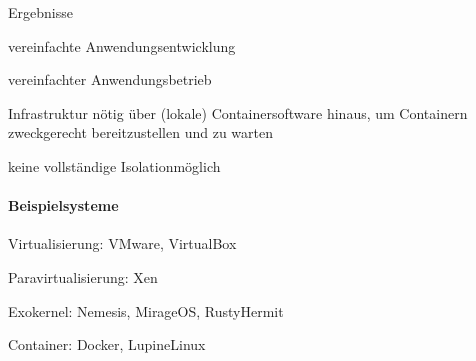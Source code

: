 \documentclass[a4paper]{article}
\newcommand{\cmark}{\ding{51}}
\newcommand{\xmark}{\ding{55}}
\begin{document}
\begin{multicols}{3}
    Ergebnisse
    \begin{itemize*}
        \item[\cmark] vereinfachte Anwendungsentwicklung
        \item[\cmark] vereinfachter Anwendungsbetrieb
        \item[\xmark] Infrastruktur nötig über (lokale) Containersoftware hinaus, um Containern zweckgerecht bereitzustellen und zu warten
        \item[\xmark] keine vollständige Isolationmöglich
    \end{itemize*}

    \paragraph{Beispielsysteme}
    \begin{itemize*}
        \item Virtualisierung: VMware, VirtualBox
        \item Paravirtualisierung: Xen
        \item Exokernel: Nemesis, MirageOS, RustyHermit
        \item Container: Docker, LupineLinux
    \end{itemize*}


\end{multicols}
\end{document}
